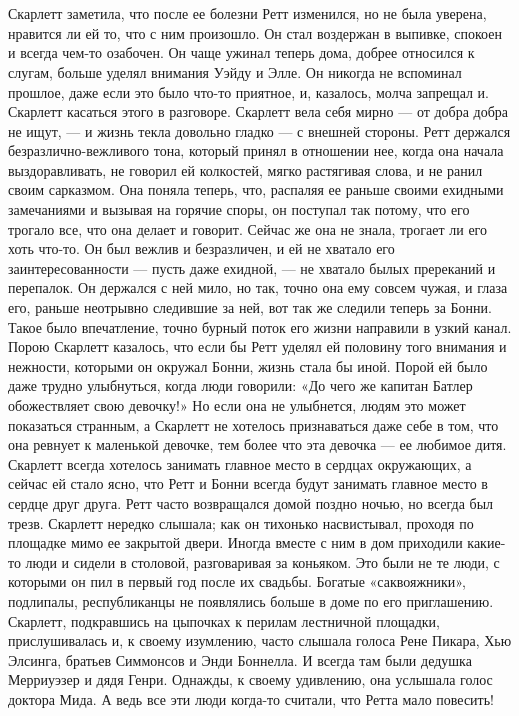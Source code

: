 \chapter{\ }

Скарлетт заметила, что после ее болезни Ретт изменился, но не была уверена, нравится ли ей то, что с ним произошло. Он стал воздержан в выпивке, спокоен и всегда чем-то озабочен. Он чаще ужинал теперь дома, добрее относился к слугам, больше уделял внимания Уэйду и Элле. Он никогда не вспоминал прошлое, даже если это было что-то приятное, и, казалось, молча запрещал и. Скарлетт касаться этого в разговоре. Скарлетт вела себя мирно — от добра добра не ищут, — и жизнь текла довольно гладко — с внешней стороны. Ретт держался безразлично-вежливого тона, который принял в отношении нее, когда она начала выздоравливать, не говорил ей колкостей, мягко растягивая слова, и не ранил своим сарказмом.
Она поняла теперь, что, распаляя ее раньше своими ехидными замечаниями и вызывая на горячие споры, он поступал так потому, что его трогало все, что она делает и говорит. Сейчас же она не знала, трогает ли его хоть что-то. Он был вежлив и безразличен, и ей не хватало его заинтересованности — пусть даже ехидной, — не хватало былых пререканий и перепалок.
Он держался с ней мило, но так, точно она ему совсем чужая, и глаза его, раньше неотрывно следившие за ней, вот так же следили теперь за Бонни. Такое было впечатление, точно бурный поток его жизни направили в узкий канал. Порою Скарлетт казалось, что если бы Ретт уделял ей половину того внимания и нежности, которыми он окружал Бонни, жизнь стала бы иной. Порой ей было даже трудно улыбнуться, когда люди говорили: «До чего же капитан Батлер обожествляет свою девочку!» Но если она не улыбнется, людям это может показаться странным, а Скарлетт не хотелось признаваться даже себе в том, что она ревнует к маленькой девочке, тем более что эта девочка — ее любимое дитя. Скарлетт всегда хотелось занимать главное место в сердцах окружающих, а сейчас ей стало ясно, что Ретт и Бонни всегда будут занимать главное место в сердце друг друга.
Ретт часто возвращался домой поздно ночью, но всегда был трезв. Скарлетт нередко слышала; как он тихонько насвистывал, проходя по площадке мимо ее закрытой двери. Иногда вместе с ним в дом приходили какие-то люди и сидели в столовой, разговаривая за коньяком. Это были не те люди, с которыми он пил в первый год после их свадьбы. Богатые «саквояжники», подлипалы, республиканцы не появлялись больше в доме по его приглашению. Скарлетт, подкравшись на цыпочках к перилам лестничной площадки, прислушивалась и, к своему изумлению, часто слышала голоса Рене Пикара, Хью Элсинга, братьев Симмонсов и Энди Боннелла. И всегда там были дедушка Мерриуэзер и дядя Генри. Однажды, к своему удивлению, она услышала голос доктора Мида. А ведь все эти люди когда-то считали, что Ретта мало повесить!
